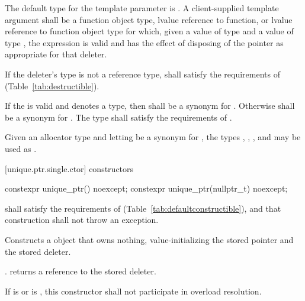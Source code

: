 \pnum
The default type for the template parameter  is
. A client-supplied template argument
 shall be a function
object type, lvalue reference to function, or
lvalue reference to function object type
for which, given
a value  of type  and a value
 of type , the expression
 is valid and has the effect of disposing of the
pointer as appropriate for that deleter.

\pnum
If the deleter's type  is not a reference type,  shall satisfy
the requirements of  (Table~\ref{tab:destructible}).

\pnum
If the   is valid and denotes a
type, then  shall be a synonym for . Otherwise
 shall be a synonym for . The type  shall
satisfy the requirements of .

\pnum
\begin{example} Given an allocator type  and
letting  be a synonym for , the types ,
, , and 
may be used as . \end{example}

[unique.ptr.single.ctor]{ constructors}

%
\begin{itemdecl}
constexpr unique_ptr() noexcept;
constexpr unique_ptr(nullptr_t) noexcept;
\end{itemdecl}

\begin{itemdescr}
\pnum
\requires {} shall
satisfy the requirements of  (Table~\ref{tab:defaultconstructible}),
and that construction shall not throw an exception.

\pnum
\effects Constructs a  object that owns
nothing, value-initializing the stored pointer and the stored deleter.

\pnum
\postconditions {}. 
returns a reference to the stored deleter.

\pnum
\remarks If  is  or
 is ,
this constructor shall not participate in overload resolution.
\end{itemdescr}

